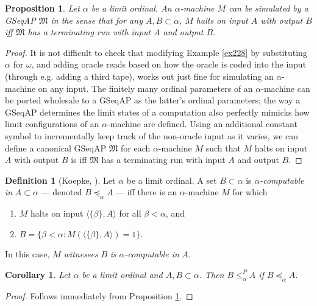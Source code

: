 \documentclass[12pt, twoside]{memoir}
\numberwithin{equation}{section}
\newtheorem{prop}[thm]{Proposition}
\newtheorem{cor}[thm]{Corollary}
\theoremstyle{definition}
\newtheorem{defi}[thm]{Definition}
\theoremstyle{remark}
\theoremstyle{definition}
\theoremstyle{definition}
\theoremstyle{definition}
\theoremstyle{remark}
\begin{document}
\begin{prop}\label{prop270}
Let $\alpha$ be a limit ordinal. An $\alpha$-machine $M$ can be simulated by a GSeqAP $\mathfrak{M}$ in the sense that for any $A, B \subset \alpha$, $M$ halts on input $A$ with output $B$ iff $\mathfrak{M}$ has a terminating run with input $A$ and output $B$.
\end{prop}

\begin{proof}
It is not difficult to check that modifying Example \ref{ex228} by substituting $\alpha$ for $\omega$, and adding oracle reads based on how the oracle is coded into the input (through e.g. adding a third tape), works out just fine for simulating an $\alpha$-machine on any input. The finitely many ordinal parameters of an $\alpha$-machine can be ported wholesale to a GSeqAP as the latter's ordinal parameters; the way a GSeqAP determines the limit states of a computation also perfectly mimicks how limit configurations of an $\alpha$-machine are defined. Using an additional constant symbol to incrementally keep track of the non-oracle input as it varies, we can define a canonical GSeqAP $\mathfrak{M}$ for each $\alpha$-machine $M$ such that $M$ halts on input $A$ with output $B$ is iff $\mathfrak{M}$ has a terminating run with input $A$ and output $B$.
\end{proof}

\begin{defi}[Koepke, \cite{koepke2}]
Let $\alpha$ be a limit ordinal. A set $B \subset \alpha$ is $\alpha$\emph{-computable in} $A \subset \alpha$ --- denoted $B \preceq_{\alpha} A$ --- iff there is an $\alpha$-machine $M$ for which
\begin{enumerate}[label=(\alph*)]
    \item $M$ halts on input $\langle \{\beta\}, A \rangle$ for all $\beta < \alpha$, and
    \item $B = \{\beta < \alpha : M(\langle \{\beta\}, A \rangle) = 1\}$.
\end{enumerate}
In this case, $M$ \emph{witnesses} $B$ \emph{is} $\alpha$\emph{-computable in} $A$.
\end{defi}

\begin{cor}\label{cor334}
Let $\alpha$ be a limit ordinal and $A, B \subset \alpha$. Then $B \leq^{P}_{\alpha} A$ if $B \preceq_{\alpha} A$.
\end{cor}

\begin{proof}
Follows immediately from Proposition \ref{prop270}.
\end{proof}
\end{document}
